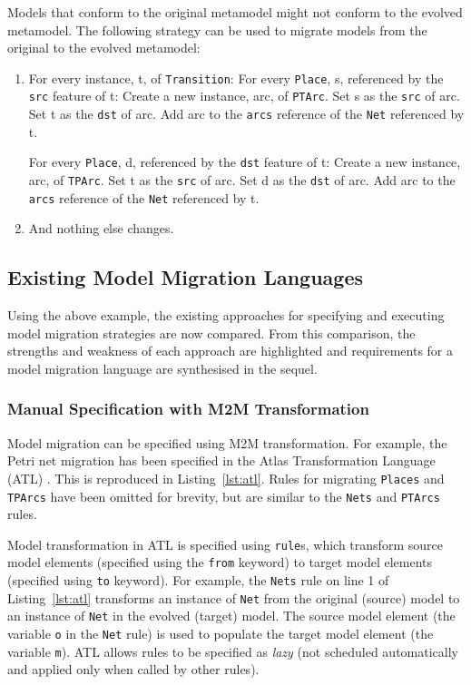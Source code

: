 Models that conform to the original metamodel might not conform to the evolved metamodel. The following strategy can be used to migrate models from the original to the evolved metamodel:

\begin{enumerate}
	\item For every instance, t, of \texttt{Transition}: 
	\subitem For every \texttt{Place}, s, referenced by the \texttt{src} feature of t: 
	\subsubitem Create a new instance, arc, of \texttt{PTArc}. 
	\subsubitem Set s as the \texttt{src} of arc. 
	\subsubitem Set t as the \texttt{dst} of arc. 
	\subsubitem Add arc to the \texttt{arcs} reference of the \texttt{Net} referenced by t.
	
	\subitem For every \texttt{Place}, d, referenced by the \texttt{dst} feature of t: 
	\subsubitem Create a new instance, arc, of \texttt{TPArc}. 
	\subsubitem Set t as the \texttt{src} of arc. 
	\subsubitem Set d as the \texttt{dst} of arc. 
	\subsubitem Add arc to the \texttt{arcs} reference of the \texttt{Net} referenced by t.
	
	\item And nothing else changes.
\end{enumerate}

\subsection{Existing Model Migration Languages}
\label{subsec:existing_migration_languages}
Using the above example, the existing approaches for specifying and executing model migration strategies are now compared. From this comparison, the strengths and weakness of each approach are highlighted and requirements for a model migration language are synthesised in the sequel.

\subsubsection{Manual Specification with M2M Transformation}
\label{subsubsec:m2m}
Model migration can be specified using M2M transformation. For example, the Petri net migration has been specified in the Atlas Transformation Language (ATL) \cite{jouault05transforming}. This is reproduced in Listing~\ref{lst:atl}. Rules for migrating \texttt{Places} and \texttt{TPArcs} have been omitted for brevity, but are similar to the \texttt{Nets} and \texttt{PTArcs} rules.

Model transformation in ATL is specified using \texttt{rule}s, which transform source model elements (specified using the \texttt{fr\-om} keyword) to target model elements (specified using \texttt{to} keyword). For example, the \texttt{Nets} rule on line 1 of Listing~\ref{lst:atl} transforms an instance of \texttt{Net} from the original (source) model to an instance of \texttt{Net} in the evolved (target) model. The source model element (the variable \texttt{o} in the \texttt{Net} rule) is used to populate the target model element (the variable \texttt{m}). ATL allows rules to be specified as \emph{lazy} (not scheduled automatically and applied only when called by other rules).

